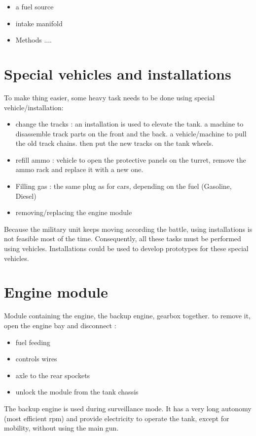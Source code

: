 \documentclass[12pt,a4paper]{article}
\begin{document}
\begin{itemize}
	\item a fuel source
	\item intake manifold 
	\item Methods ....
\end{itemize}

\medbreak



\section{Special vehicles and installations}
To make thing easier, some heavy task needs to be done using special vehicle/installation:
\begin{itemize}
	\item change the tracks : an installation is used to elevate the tank. a machine to disassemble track parts on the front and  the back. a vehicle/machine to pull the old track chains. then put the new tracks on the tank wheels. 
	\item refill ammo : vehicle to open the protective panels on the turret, remove the ammo rack and replace it with a new one.
	\item Filling gas : the same plug as for cars, depending on the fuel (Gasoline, Diesel)
	\item removing/replacing the engine module
\end{itemize}

Because the military unit keeps moving according the battle, using installations is not feasible most of the time. Consequently, all these tasks must be performed using vehicles. Installations could be used to develop prototypes for these special vehicles. 

\section{Engine module}
Module containing the engine, the backup engine, gearbox together. 
to remove it, open the engine bay and disconnect : 
\begin{itemize}
	\item fuel feeding
	\item controls wires
	\item axle to the rear spockets
	\item unlock the module from the tank chassis
\end{itemize}
The backup engine is used during surveillance mode. 
It has a very long autonomy (most efficient rpm) and provide electricity to operate the tank, except for mobility, without using the main gun. 
\end{document}
